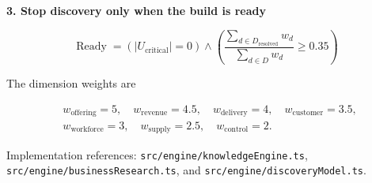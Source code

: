 \documentclass[10pt,letterpaper]{article}
\begin{document}
\textbf{3. Stop discovery only when the build is ready}

\begin{equation*}
\boxed{
\operatorname{Ready}=
\left(\lvert U_{\mathrm{critical}}\rvert=0\right)
\land
\left(
\frac{\displaystyle\sum_{d\in D_{\mathrm{resolved}}}w_d}
     {\displaystyle\sum_{d\in D}w_d}
\geq 0.35
\right)
}
\end{equation*}

The dimension weights are

\begin{equation*}
\begin{aligned}
&w_{\mathrm{offering}}=5,\quad
w_{\mathrm{revenue}}=4.5,\quad
w_{\mathrm{delivery}}=4,\quad
w_{\mathrm{customer}}=3.5,\\
&w_{\mathrm{workforce}}=3,\quad
w_{\mathrm{supply}}=2.5,\quad
w_{\mathrm{control}}=2.
\end{aligned}
\end{equation*}

\vfill
{\footnotesize\color{bomuted}
Implementation references: \texttt{src/engine/knowledgeEngine.ts},
\texttt{src/engine/businessResearch.ts}, and
\texttt{src/engine/discoveryModel.ts}.}
\end{document}
